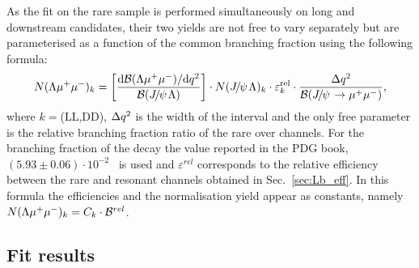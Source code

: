 \begin{table}
\centering
\caption{Predicted numbers of $\Bz\ra\KS\mumu$ events in each considered \qsq interval.}
\label{tab:KSprediction}
\end{table}

As the fit on the rare sample is performed simultaneously on long and downstream candidates,
their two yields are not free to vary separately but are parameterised
as a function of the common branching fraction using the following formula:
%
\begin{equation}
N(\Lz\mumu)_{k}  = \left[ \frac{\mathrm{d}\mathcal{B}(\Lz\mumu)/\mathrm{d}\qsq}{\mathcal{B}(\jpsi\Lz)} \right]  \cdot
N(\jpsi\Lz)_{k} \cdot \varepsilon^{\mathrm{rel}}_{k} \cdot \frac {\Delta\qsq} { \mathcal{B}(\jpsi\to\mumu) },
\label{eq:relYield}
\end{equation}
%
where $k = $(LL,DD), $\Delta q^2$ is the width of the \qsq interval and the only free parameter is the relative branching 
fraction ratio of the rare over \jpsi channels. For the branching fraction of the \jpsi\to\mumu decay the value 
reported in the PDG book, \mbox{$(5.93 \pm 0.06)\cdot 10^{-2}$~\cite{PDG2014}} is used and $\varepsilon^{rel}$ corresponds to
the relative efficiency between the rare and resonant channels obtained in Sec.~\ref{sec:Lb_eff}. 
In this formula the efficiencies and the normalisation yield appear as constants, namely 
$N(\Lambda\mu^+\mu^-)_{k} = C_k \cdot \mathcal{B}^{rel}$. 


\subsection{Fit results}




